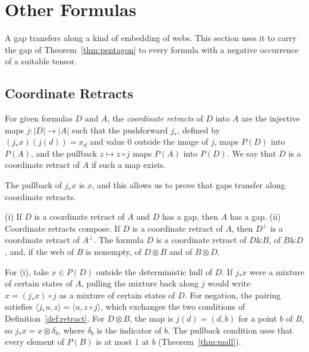 \section{Other Formulas}
\label{sec:other}

A gap transfers along a kind of embedding of webs. This section uses it
to carry the gap of Theorem~\ref{thm:pentagon} to every formula with a
negative occurrence of a suitable tensor.

\subsection{Coordinate Retracts}
\label{sec:other-retract}

\begin{definition}
\label{def:retract}
For given formulas $D$ and $A$, the \emph{coordinate retracts} of $D$
into $A$ are the injective maps $j : |D| \to |A|$ such that the
pushforward $j_{*}$, defined by $(j_{*}x)(j(d)) = x_d$ and value $0$
outside the image of $j$, maps $P(D)$ into $P(A)$, and the pullback
$z \mapsto z \circ j$ maps $P(A)$ into $P(D)$. We say that $D$ is a
coordinate retract of $A$ if such a map exists.
\end{definition}

\noindent
The pullback of $j_{*}x$ is $x$, and this allows us to prove that gaps
transfer along coordinate retracts.

\begin{theorem}
\label{thm:retract}
(i) If $D$ is a coordinate retract of $A$ and $D$ has a gap, then $A$ has
a gap.
(ii) Coordinate retracts compose. If $D$ is a coordinate retract of $A$,
then $D^{\perp}$ is a coordinate retract of $A^{\perp}$. The formula $D$
is a coordinate retract of $D \mathbin{\&} B$, of $B \mathbin{\&} D$,
and, if the web of $B$ is nonempty, of $D \otimes B$ and of $B \otimes D$.
\end{theorem}

\noindent
For (i), take $x \in P(D)$ outside the deterministic hull of $D$. If $j_{*}x$ were a
mixture of certain states of $A$, pulling the mixture back along $j$
would write $x = (j_{*}x) \circ j$ as a mixture of certain states of $D$.
For negation, the pairing satisfies
$\langle j_{*}u, z \rangle = \langle u, z \circ j \rangle$, which exchanges
the two conditions of Definition~\ref{def:retract}. For $D \otimes B$,
the map is $j(d) = (d, b)$ for a point $b$ of $B$, so
$j_{*}x = x \otimes \delta_b$, where $\delta_b$ is the indicator of $b$. The pullback condition uses that every element of $P(B)$ is at most
$1$ at $b$ (Theorem~\ref{thm:mall}).


